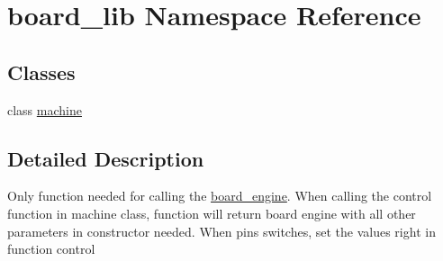 \hypertarget{namespaceboard__lib}{}\section{board\+\_\+lib Namespace Reference}
\label{namespaceboard__lib}
\subsection*{Classes}
\begin{DoxyCompactItemize}
\item 
class \hyperlink{classboard__lib_1_1machine}{machine}
\end{DoxyCompactItemize}


\subsection{Detailed Description}
Only function needed for calling the \hyperlink{classboard__engine}{board\+\_\+engine}. When calling the {\ttfamily control} function in {\ttfamily machine} class, function will return board engine with all other parameters in constructor needed. When pins switches, set the values right in function {\ttfamily control} 
